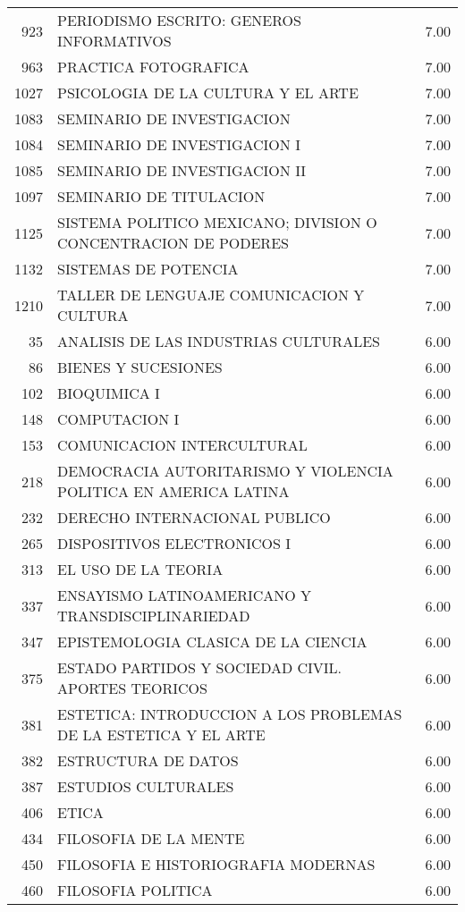 \documentclass[12pt]{article}
\begin{document}
\begin{table}[ht]
{\begin{tabular}{rlr}
  923 & PERIODISMO ESCRITO: GENEROS INFORMATIVOS & 7.00 \\ 
  963 & PRACTICA FOTOGRAFICA & 7.00 \\ 
  1027 & PSICOLOGIA DE LA CULTURA Y EL ARTE & 7.00 \\ 
  1083 & SEMINARIO DE INVESTIGACION & 7.00 \\ 
  1084 & SEMINARIO DE INVESTIGACION I & 7.00 \\ 
  1085 & SEMINARIO DE INVESTIGACION II & 7.00 \\ 
  1097 & SEMINARIO DE TITULACION & 7.00 \\ 
  1125 & SISTEMA POLITICO MEXICANO; DIVISION O CONCENTRACION DE PODERES & 7.00 \\ 
  1132 & SISTEMAS DE POTENCIA & 7.00 \\ 
  1210 & TALLER DE LENGUAJE COMUNICACION Y CULTURA & 7.00 \\ 
  35 & ANALISIS DE LAS INDUSTRIAS CULTURALES & 6.00 \\ 
  86 & BIENES Y SUCESIONES & 6.00 \\ 
  102 & BIOQUIMICA I & 6.00 \\ 
  148 & COMPUTACION I & 6.00 \\ 
  153 & COMUNICACION INTERCULTURAL & 6.00 \\ 
  218 & DEMOCRACIA AUTORITARISMO Y VIOLENCIA POLITICA EN AMERICA LATINA & 6.00 \\ 
  232 & DERECHO INTERNACIONAL PUBLICO & 6.00 \\ 
  265 & DISPOSITIVOS ELECTRONICOS I & 6.00 \\ 
  313 & EL USO DE LA TEORIA & 6.00 \\ 
  337 & ENSAYISMO LATINOAMERICANO Y TRANSDISCIPLINARIEDAD & 6.00 \\ 
  347 & EPISTEMOLOGIA CLASICA DE LA CIENCIA & 6.00 \\ 
  375 & ESTADO PARTIDOS Y SOCIEDAD CIVIL. APORTES TEORICOS & 6.00 \\ 
  381 & ESTETICA: INTRODUCCION A LOS PROBLEMAS DE LA ESTETICA Y EL ARTE & 6.00 \\ 
  382 & ESTRUCTURA DE DATOS & 6.00 \\ 
  387 & ESTUDIOS CULTURALES & 6.00 \\ 
  406 & ETICA & 6.00 \\ 
  434 & FILOSOFIA DE LA MENTE & 6.00 \\ 
  450 & FILOSOFIA E HISTORIOGRAFIA MODERNAS & 6.00 \\ 
  460 & FILOSOFIA POLITICA & 6.00 \\ 

\end{tabular}}
\end{table}
\end{document}
